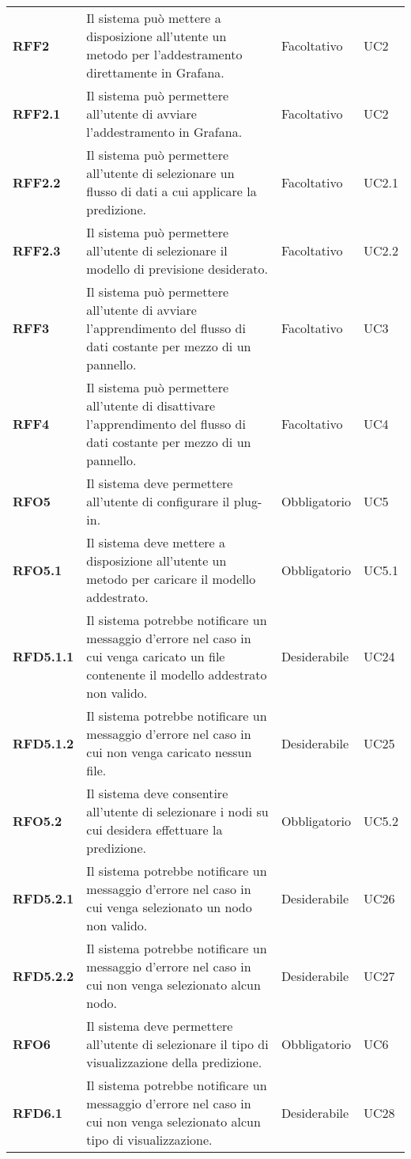 \begin{longtable}[H]{>{\centering\bfseries}m{2cm} >{\centering}m{9cm} >{\centering}m{2.5cm} >{\centering\arraybackslash}m{2.5cm}}
  \textbf{RFF2} & Il sistema può mettere a disposizione all'utente un metodo per l’addestramento direttamente in Grafana. & Facoltativo & UC2 \\
  \textbf{RFF2.1} & Il sistema può permettere all’utente di avviare l’addestramento in Grafana. & Facoltativo & UC2 \\
  \textbf{RFF2.2} & Il sistema può permettere all'utente di selezionare un flusso di dati a cui applicare la predizione. & Facoltativo & UC2.1 \\
  \textbf{RFF2.3} & Il sistema può permettere all’utente di selezionare il modello di previsione desiderato. & Facoltativo & UC2.2 \\
  \textbf{RFF3} & Il sistema può permettere all'utente di avviare l'apprendimento del flusso di dati costante per mezzo di un pannello. & Facoltativo & UC3 \\
  \textbf{RFF4} & Il sistema può permettere all'utente di disattivare l'apprendimento del flusso di dati costante per mezzo di un pannello. & Facoltativo & UC4 \\
  \textbf{RFO5} & Il sistema deve permettere all’utente di configurare il plug-in. & Obbligatorio & UC5 \\
  \textbf{RFO5.1} & Il sistema deve mettere a disposizione all’utente un metodo per caricare il modello addestrato. & Obbligatorio & UC5.1 \\
  \textbf{RFD5.1.1} & Il sistema potrebbe notificare un messaggio d'errore nel caso in cui venga caricato un file contenente il modello addestrato non valido. & Desiderabile & UC24 \\
  \textbf{RFD5.1.2} & Il sistema potrebbe notificare un messaggio d'errore nel caso in cui non venga caricato nessun file. & Desiderabile & UC25 \\
  \textbf{RFO5.2} & Il sistema deve consentire all’utente di selezionare i nodi su cui desidera effettuare la predizione. & Obbligatorio & UC5.2 \\
  \textbf{RFD5.2.1} & Il sistema potrebbe notificare un messaggio d'errore nel caso in cui venga selezionato un nodo non valido. & Desiderabile & UC26 \\
  \textbf{RFD5.2.2} & Il sistema potrebbe notificare un messaggio d'errore nel caso in cui non venga selezionato alcun nodo. & Desiderabile & UC27 \\
  \textbf{RFO6} & Il sistema deve permettere all’utente di selezionare il tipo di visualizzazione della predizione. & Obbligatorio & UC6 \\
  \textbf{RFD6.1} & Il sistema potrebbe notificare un messaggio d'errore nel caso in cui non venga selezionato alcun tipo di visualizzazione. & Desiderabile & UC28 \\

\end{longtable}
